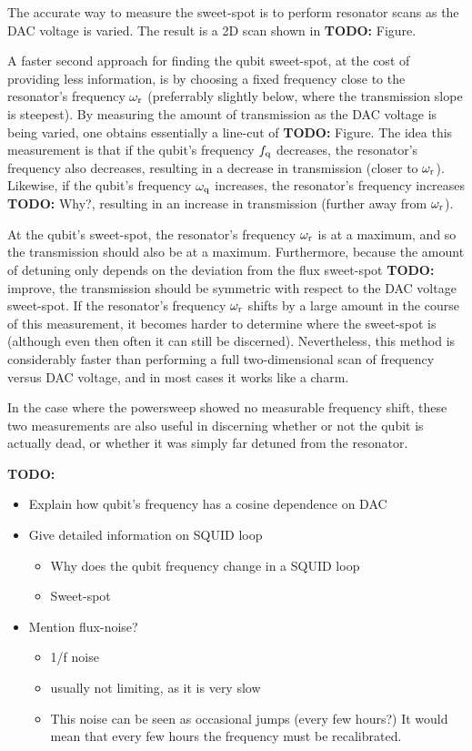        The accurate way to measure the sweet-spot is to perform resonator scans as the DAC voltage is varied. The result is a 2D scan shown in \textbf{TODO:} Figure.

        A faster second approach for finding the qubit sweet-spot, at the cost of providing less information, is by choosing a fixed frequency close to the resonator's frequency $\omega_\text{r}$ (preferrably slightly below, where the transmission slope is steepest). By measuring the amount of transmission as the DAC voltage is being varied, one obtains essentially a line-cut of \textbf{TODO:} Figure. The idea this measurement is that if the qubit's frequency $f_\text{q}$ decreases, the resonator's frequency also decreases, resulting in a decrease in transmission (closer to $\omega_\text{r}$). Likewise, if the qubit's frequency $\omega_\text{q}$ increases, the resonator's frequency increases \textbf{TODO:} Why?, resulting in an increase in transmission (further away from $\omega_\text{r}$).

        At the qubit's sweet-spot, the resonator's frequency $\omega_\text{r}$ is at a maximum, and so the transmission should also be at a maximum. Furthermore, because the amount of detuning only depends on the deviation from the flux sweet-spot \textbf{TODO:} improve, the transmission should be symmetric with respect to the DAC voltage sweet-spot. If the resonator's frequency $\omega_\text{r}$ shifts by a large amount in the course of this measurement, it becomes harder to determine where the sweet-spot is (although even then often it can still be discerned). Nevertheless, this method is considerably faster than performing a full two-dimensional scan of frequency versus DAC voltage, and in most cases it works like a charm.

        In the case where the powersweep showed no measurable frequency shift, these two measurements are also useful in discerning whether or not the qubit is actually dead, or whether it was simply far detuned from the resonator.


        \textbf{TODO:}
        \begin{itemize}
          \item Explain how qubit's frequency has a cosine dependence on DAC
          \item Give detailed information on SQUID loop
          \begin{itemize}
            \item Why does the qubit frequency change in a SQUID loop
            \item Sweet-spot
          \end{itemize}
          \item Mention flux-noise?
          \begin{itemize}
            \item 1/f noise
            \item usually not limiting, as it is very slow
            \item This noise can be seen as occasional jumps (every few hours?) It would mean that every few hours the frequency must be recalibrated.
          \end{itemize}
        \end{itemize}


